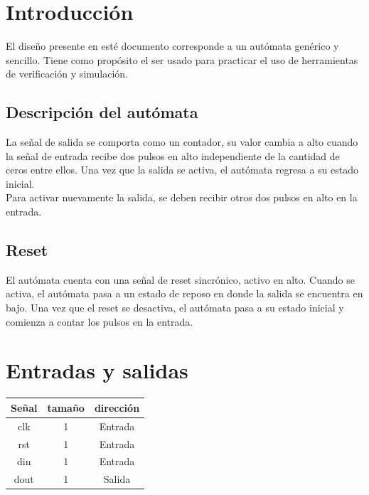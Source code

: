 \documentclass[
	12pt,
	spanish,
]{./recursos/fphw}
\begin{document}
\section{Introducción}

    El diseño presente en esté documento corresponde a un autómata genérico y sencillo. Tiene como propósito el ser
    usado para practicar el uso de herramientas de verificación y simulación.\\

    \subsection{Descripción del autómata}
    La señal de salida se comporta como un contador, su valor cambia a alto cuando la señal de entrada recibe dos pulsos en alto independiente de la cantidad de ceros entre ellos. Una vez que la salida se activa, el autómata regresa a su estado inicial.\\ 
    Para activar nuevamente la salida, se deben recibir otros dos pulsos en alto en la entrada.\\

    \subsection{Reset}
    El autómata cuenta con una señal de reset sincrónico, activo en alto. Cuando se activa, el autómata pasa a un estado de reposo en donde la salida se encuentra en bajo. Una vez que el reset se desactiva, el autómata pasa a su estado inicial y comienza a contar los pulsos en la entrada.\\
    


\section{Entradas y salidas}
    \begin{center} \begin{tabular}{| c | c | c |}
            Señal           & tamaño  &  dirección \\ \hline \hline
            clk             & 1       &  Entrada   \\ \hline
            rst             & 1       &  Entrada   \\ \hline
            din             & 1       &  Entrada   \\ \hline
            dout            & 1       &  Salida    \\ \hline
        \end{tabular}
        \label{tab:tabla_estados}
    \end{center}
\end{document}
